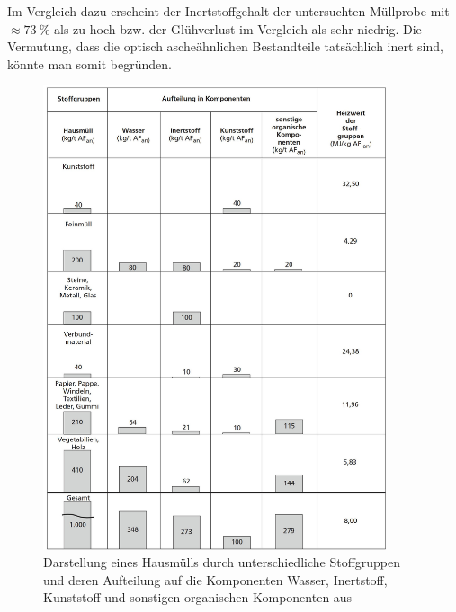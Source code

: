 Im Vergleich dazu erscheint der Inertstoffgehalt der untersuchten Müllprobe mit $\approx \SI{73}{\percent}$ als zu hoch bzw. der Glühverlust im Vergleich als sehr niedrig. Die Vermutung, dass die optisch ascheähnlichen Bestandteile tatsächlich inert sind, könnte man somit begründen.
\begin{figure}[h!]
	\centering
	\includegraphics[width=0.90\textwidth]{img/ThermischeVerfahren}
	\caption[Darstellung eines Hausmülls durch unterschiedliche Stoffgruppen und deren Aufteilung auf die Komponenten Wasser, Inertstoff, Kunststoff und sonstigen organischen Komponenten]{Darstellung eines Hausmülls durch unterschiedliche Stoffgruppen und deren Aufteilung auf die Komponenten Wasser, Inertstoff, Kunststoff und sonstigen organischen Komponenten aus \cite[S.23]{scholz2013}}
	\label{fig:ersatzbrennstoffe}
\end{figure}
\FloatBarrier

 

